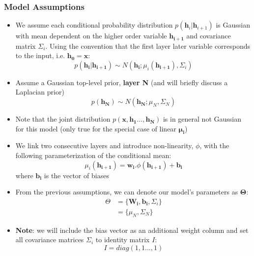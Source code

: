 \documentclass[main]{subfiles}
\begin{document}
\subsubsection{Model Assumptions}
\begin{itemize}
    \item We assume each conditional probability distribution $p(\bm{h}_i|\bm{h}_{i+1})$ is Gaussian with mean dependent on the higher order variable $\bm{h_{i+1}}$ and covariance matrix $\Sigma_i$. Using the convention that the first layer later variable corresponds to the input, i.e. $\bm{h_0} = \bm{x}$:
        \begin{equation}
            p(\bm{h_i}|\bm{h_{i+1}}) \sim N(\bm{h_i}; \mu_i(\bm{h_{i+1}}), \Sigma_i)
        \end{equation}
        
    \item Assume a Gaussian top-level prior, \textbf{layer N} (and will briefly discuss a Laplacian prior)
       \begin{equation}
            p(\bm{h_N}) \sim N(\bm{h_N}; \mu_N, \Sigma_N)
        \end{equation}
    \item Note that the joint distribution $p(\bm{x},\bm{h_1}\dots, \bm{h_N})$ is in general not Gaussian for this model (only true for the special case of linear $\bm{\mu_i}$)
    
    \item We link two consecutive layers and introduce non-linearity, $\phi$, with the following parameterization of the conditional mean:
        \begin{equation}
            \mu_i(\bm{h_{i+1}}) = \bm{w_{i}}. \phi(\bm{h_{i+1}}) + \bm{b_i}
        \end{equation}
        where $\bm{b_i}$ is the vector of biases
    
    \item From the previous assumptions, we can denote our model's parameters as $\bm{\Theta}$:
        \begin{equation}
            \begin{split}
                 \Theta &= \big\{ \bm{W_i}, \bm{b_i}, \Sigma_i\} \\
                        &= \{ \mu_N, \Sigma_N\} 
            \end{split}
        \end{equation}
    \item \textbf{Note}: we will include the bias vector as an additional weight column and set all covariance matrices $\Sigma_i$ to identity matrix $I$:
        \begin{equation}
            I= diag(1,1 \dots , 1)
        \end{equation}
        
\end{itemize}
\end{document}
